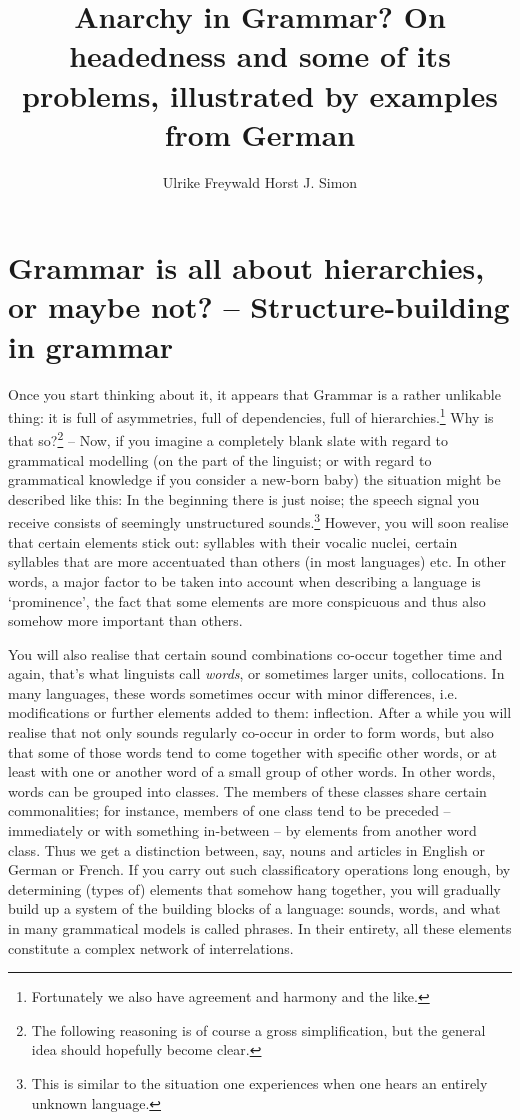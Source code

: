 \documentclass[output=paper
  ,nobabel
  ,draftmode
  ,colorlinks, citecolor=brown
]{langscibook}
\title[Anarchy in Grammar?]{Anarchy in Grammar? On headedness and some of its problems, illustrated by examples from German}
\author{Ulrike Freywald\orcid{0000-0003-3268-7874}\affiliation{TU Dortmund} \lastand Horst J. Simon\orcid{0000-0002-6367-2969}\affiliation{Freie Universität Berlin}}
\begin{document}
\maketitle


\section{Grammar is all about hierarchies, or maybe not? – Structure-building in grammar}

Once you start thinking about it, it appears that Grammar is a rather unlikable thing: it is full of
asymmetries, full of dependencies, full of hierarchies.\footnote{Fortunately we also have agreement
  and harmony and the like.} Why is that so?\footnote{The following reasoning is of course a gross
  simplification, but the general idea should hopefully become clear.} – Now, if you imagine a
completely blank slate with regard to grammatical modelling (on the part of the linguist; or with
regard to grammatical knowledge if you consider a new-born baby) the situation might be described
like this: In the beginning there is just noise; the speech signal you receive consists of seemingly
unstructured sounds.\footnote{This is similar to the situation one experiences when one hears an
  entirely unknown language.} However, you will soon realise that certain elements stick out:
syllables with their vocalic nuclei, certain syllables that are more accentuated than others (in
most languages) etc. In other words, a major factor to be taken into account when describing a
language is `prominence', the fact that some elements are more conspicuous and thus also somehow
more important than others.

You will also realise that certain sound combinations co-occur together time and again, that's what
linguists call \emph{words}, or sometimes larger units, collocations. In many languages, these
words sometimes occur with minor differences, i.e. modifications or further elements added to them:
inflection. After a while you will realise that not only sounds regularly co-occur in order to form
words, but also that some of those words tend to come together with specific other words, or at
least with one or another word of a small group of other words. In other words, words can be grouped
into classes. The members of these classes share certain commonalities; for instance, members of one
class tend to be preceded – immediately or with something in-between – by elements from another word
class. Thus we get a distinction between, say, nouns and articles in English or German or French. If
you carry out such classificatory operations long enough, by determining (types of) elements that
somehow hang together, you will gradually build up a system of the building blocks of a language:
sounds, words, and what in many grammatical models is called phrases. In their entirety, all these
elements constitute a complex network of interrelations.
\end{document}
